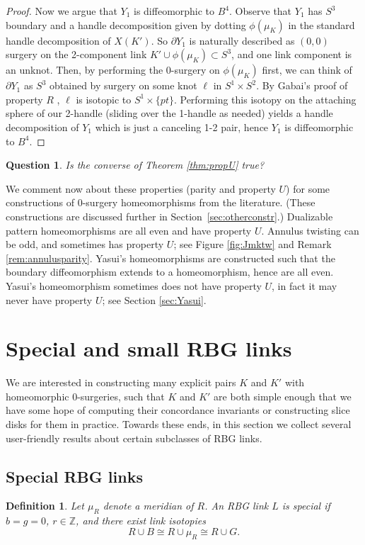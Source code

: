 \documentclass [11pt]{amsart}
\newtheorem {definition}[theorem]{Definition}
\newtheorem {question}[theorem]{Question}
\theoremstyle{remark}
\def\Z {{\mathbb{Z}}}
\begin{document}
\begin{proof}
Now we argue that $Y_1$ is diffeomorphic to $B^4$. Observe that $Y_1$ has $S^3$ boundary and a handle decomposition given by dotting $\phi(\mu_K)$ in the standard handle decomposition of $X(K')$. So $\partial Y_1$ is naturally described as $(0,0)$ surgery on the 2-component link $K' \cup \phi(\mu_K) \subset S^3$, and one link component is an unknot. Then, by performing the 0-surgery on $\phi(\mu_K)$ first, we can think of $\partial Y_1$ as $S^3$ obtained by surgery on some knot $\ell$ in $S^1\times S^2$. By Gabai's proof of property $R$ \cite{GabaiR}, $\ell$ is isotopic to $S^1\times \{pt\}$. Performing this isotopy on the attaching sphere of our 2-handle (sliding over the 1-handle as needed) yields a handle decomposition of $Y_1$ which is just a canceling 1-2 pair, hence $Y_1$ is diffeomorphic to $B^4$. 
\end{proof}
\begin{question}\label{ques:propU}
Is the converse of Theorem \ref{thm:propU} true?
\end{question}


We comment now about these properties (parity and property $U$) for some constructions of 0-surgery homeomorphisms from the literature. (These constructions are discussed further in Section~\ref{sec:otherconstr}.) Dualizable pattern homeomorphisms \cite{Lickorish1, Brakes, GM} are all even and have property $U$. Annulus twisting  \cite{Osoinach} can be odd, and sometimes has property $U$; see Figure \ref{fig:Jmktw} and Remark \ref{rem:annulusparity}. Yasui's homeomorphisms \cite{Yasui} are constructed such that the boundary diffeomorphism extends to a homeomorphism, hence are all even. Yasui's homeomorphism sometimes does not have property $U$, in fact it may never have property $U$; see Section \ref{sec:Yasui}. 


\section{Special and small RBG links}\label{sec:smallspecial}
We are interested in constructing many explicit pairs $K$ and $K'$ with homeomorphic 0-surgeries, such that $K$ and $K'$ are both simple enough that we have some hope of computing their concordance invariants or constructing slice disks for them in practice. Towards these ends, in this section we collect several user-friendly results about certain subclasses of RBG links.

\subsection{Special RBG links}
\begin{definition}
Let $\mu_R$ denote a meridian of $R$. An RBG link $L$ is \emph{special} if $b=g=0$, $r \in \Z$, and there exist link isotopies
$$R \cup B \cong R \cup \mu_R \cong R \cup G.$$ 
\end{definition} 
\end{document}
